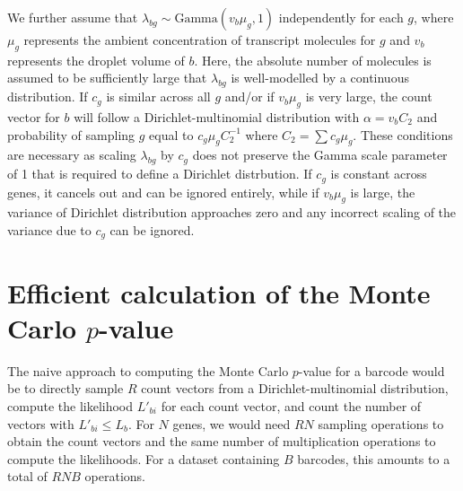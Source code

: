 \documentclass{article}
\begin{document}
We further assume that $\lambda_{bg} \sim \mbox{Gamma}(v_b\mu_g, 1)$ independently for each $g$, 
where $\mu_g$ represents the ambient concentration of transcript molecules for $g$ and $v_b$ represents the droplet volume of $b$.
Here, the absolute number of molecules is assumed to be sufficiently large that $\lambda_{bg}$ is well-modelled by a continuous distribution.
If $c_g$ is similar across all $g$ and/or if $v_b\mu_g$ is very large, the count vector for $b$ will follow a Dirichlet-multinomial distribution with $\alpha = v_b C_2$ and probability of sampling $g$ equal to $c_g\mu_g C_2^{-1}$ where $C_2 = \sum c_g\mu_g$.
These conditions are necessary as scaling $\lambda_{bg}$ by $c_g$ does not preserve the Gamma scale parameter of 1 that is required to define a Dirichlet distrbution.
If $c_g$ is constant across genes, it cancels out and can be ignored entirely, while if $v_b\mu_g$ is large, the variance of Dirichlet distribution approaches zero and any incorrect scaling of the variance due to $c_g$ can be ignored.

\section{Efficient calculation of the Monte Carlo $p$-value}
The naive approach to computing the Monte Carlo $p$-value for a barcode would be to directly sample $R$ count vectors from a Dirichlet-multinomial distribution,
compute the likelihood $L'_{bi}$ for each count vector, and count the number of vectors with $L'_{bi} \le L_{b}$.
For $N$ genes, we would need $RN$ sampling operations to obtain the count vectors and the same number of multiplication operations to compute the likelihoods.
For a dataset containing $B$ barcodes, this amounts to a total of $RNB$ operations.
\end{document}
